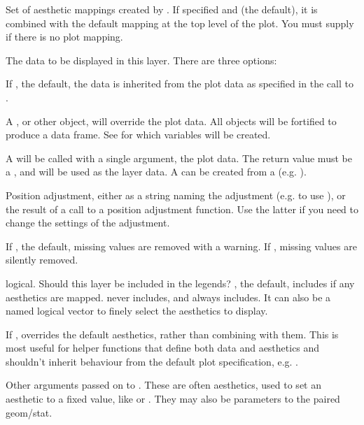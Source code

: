 \documentclass[a4paper]{book}
\begin{document}
%
\begin{Arguments}
\begin{ldescription}
\item[\code{mapping}] Set of aesthetic mappings created by . If specified and
 (the default), it is combined with the default mapping
at the top level of the plot. You must supply  if there is no plot
mapping.

\item[\code{data}] The data to be displayed in this layer. There are three
options:

If , the default, the data is inherited from the plot
data as specified in the call to .

A , or other object, will override the plot
data. All objects will be fortified to produce a data frame. See
 for which variables will be created.

A  will be called with a single argument,
the plot data. The return value must be a , and
will be used as the layer data. A  can be created
from a  (e.g. ).

\item[\code{position}] Position adjustment, either as a string naming the adjustment
(e.g.  to use ), or the result of a call to a
position adjustment function. Use the latter if you need to change the
settings of the adjustment.

\item[\code{na.rm}] If , the default, missing values are removed with
a warning. If , missing values are silently removed.

\item[\code{show.legend}] logical. Should this layer be included in the legends?
, the default, includes if any aesthetics are mapped.
 never includes, and  always includes.
It can also be a named logical vector to finely select the aesthetics to
display.

\item[\code{inherit.aes}] If , overrides the default aesthetics,
rather than combining with them. This is most useful for helper functions
that define both data and aesthetics and shouldn't inherit behaviour from
the default plot specification, e.g. .

\item[\code{...}] Other arguments passed on to . These are
often aesthetics, used to set an aesthetic to a fixed value, like
 or . They may also be parameters
to the paired geom/stat.
\end{ldescription}
\end{Arguments}
\end{document}

